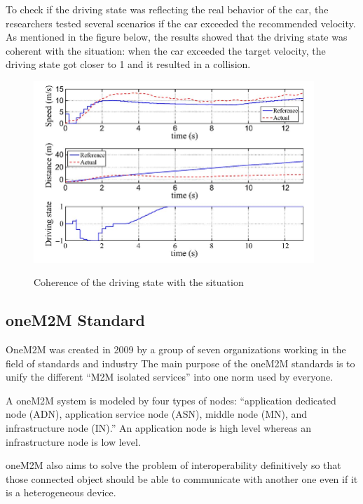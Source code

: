 To check if the driving state was reflecting the real behavior of the car, the researchers tested several scenarios if the car exceeded the recommended velocity. As mentioned in the figure below, the results showed that the driving state was coherent with the situation: when the car exceeded the target velocity, the driving state got closer to 1 and it resulted in a collision.

\begin{center}
    \begin{figure}[ht!]
        \centering
        
        \includegraphics[width=400px, keepaspectratio]{imports/graph_driving_state.png}
        
        \caption{Coherence of the driving state with the situation}  
        \cite{v2i_management}
    \end{figure}
\end{center}




\subsection{oneM2M Standard}


OneM2M was created in 2009 by a group of seven organizations working in the field of standards and industry \cite{alaya_toward_2015}
The main purpose of the oneM2M standards is to unify the different “M2M isolated services” into one norm used by everyone.
\smallskip

A oneM2M system is modeled by four types of nodes: “application dedicated node (ADN), application service node (ASN), middle node (MN), and infrastructure node (IN).” \cite{alaya_toward_2015} An application node is high level whereas an infrastructure node is low level.

oneM2M also aims to solve the problem of interoperability definitively so that those connected object should be able to communicate with another one even if it is a heterogeneous device.
\smallskip

